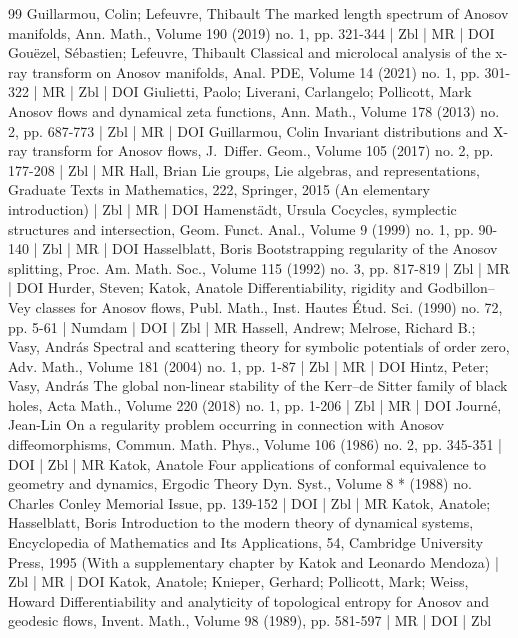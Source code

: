 \begin{thebibliography}{99}
Guillarmou, Colin; Lefeuvre, Thibault The marked length spectrum of Anosov manifolds, Ann. Math., Volume 190 (2019) no. 1, pp. 321-344 | Zbl | MR | DOI
Gouëzel, Sébastien; Lefeuvre, Thibault Classical and microlocal analysis of the x-ray transform on Anosov manifolds, Anal. PDE, Volume 14 (2021) no. 1, pp. 301-322 | MR | Zbl | DOI
Giulietti, Paolo; Liverani, Carlangelo; Pollicott, Mark Anosov flows and dynamical zeta functions, Ann. Math., Volume 178 (2013) no. 2, pp. 687-773 | Zbl | MR | DOI
Guillarmou, Colin Invariant distributions and X-ray transform for Anosov flows, J. Differ. Geom., Volume 105 (2017) no. 2, pp. 177-208 | Zbl | MR
Hall, Brian Lie groups, Lie algebras, and representations, Graduate Texts in Mathematics, 222, Springer, 2015 (An elementary introduction) | Zbl | MR | DOI
Hamenstädt, Ursula Cocycles, symplectic structures and intersection, Geom. Funct. Anal., Volume 9 (1999) no. 1, pp. 90-140 | Zbl | MR | DOI
Hasselblatt, Boris Bootstrapping regularity of the Anosov splitting, Proc. Am. Math. Soc., Volume 115 (1992) no. 3, pp. 817-819 | Zbl | MR | DOI
Hurder, Steven; Katok, Anatole Differentiability, rigidity and Godbillon–Vey classes for Anosov flows, Publ. Math., Inst. Hautes Étud. Sci. (1990) no. 72, pp. 5-61 | Numdam | DOI | Zbl | MR
Hassell, Andrew; Melrose, Richard B.; Vasy, András Spectral and scattering theory for symbolic potentials of order zero, Adv. Math., Volume 181 (2004) no. 1, pp. 1-87 | Zbl | MR | DOI
Hintz, Peter; Vasy, András The global non-linear stability of the Kerr–de Sitter family of black holes, Acta Math., Volume 220 (2018) no. 1, pp. 1-206 | Zbl | MR | DOI
Journé, Jean-Lin On a regularity problem occurring in connection with Anosov diffeomorphisms, Commun. Math. Phys., Volume 106 (1986) no. 2, pp. 345-351 | DOI | Zbl | MR
Katok, Anatole Four applications of conformal equivalence to geometry and dynamics, Ergodic Theory Dyn. Syst., Volume 8 * (1988) no. Charles Conley Memorial Issue, pp. 139-152 | DOI | Zbl | MR
Katok, Anatole; Hasselblatt, Boris Introduction to the modern theory of dynamical systems, Encyclopedia of Mathematics and Its Applications, 54, Cambridge University Press, 1995 (With a supplementary chapter by Katok and Leonardo Mendoza) | Zbl | MR | DOI
Katok, Anatole; Knieper, Gerhard; Pollicott, Mark; Weiss, Howard Differentiability and analyticity of topological entropy for Anosov and geodesic flows, Invent. Math., Volume 98 (1989), pp. 581-597 | MR | DOI | Zbl

\end{thebibliography}

